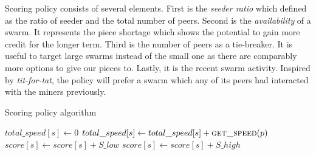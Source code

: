 Scoring policy consists of several elements. First is the \textit{seeder ratio} which defined as the ratio of seeder and the total number of peers. Second is the \textit{availability} of a swarm. It represents the piece shortage which shows the potential to gain more credit for the longer term. Third is the number of peers as a tie-breaker. It is useful to target large swarms instead of the small one as there are comparably more options to give our pieces to. Lastly, it is the recent swarm  activity. Inspired by \textit{tit-for-tat}, the policy will prefer a swarm which any of its peers had interacted with the miners previously.


\begin{algorithm}[h]
	\caption{Scoring policy algorithm}
	\label{alg:scorep}
	\begin{algorithmic}[1]
		\Statex
		\Statex
						\State $total\_speed[s] \gets 0$
				\State $total\_speed[s] \gets total\_speed[s] + \Call{get\_speed}{p}$
			\EndFor
		\EndFor
		\State {}
				\State $score[s] \gets score[s] + S\_low$
			\Else{\null}
				\State $score[s] \gets score[s] + S\_high$
			\EndIf
		\EndFor
		\State {}
	\end{algorithmic}
\end{algorithm}


